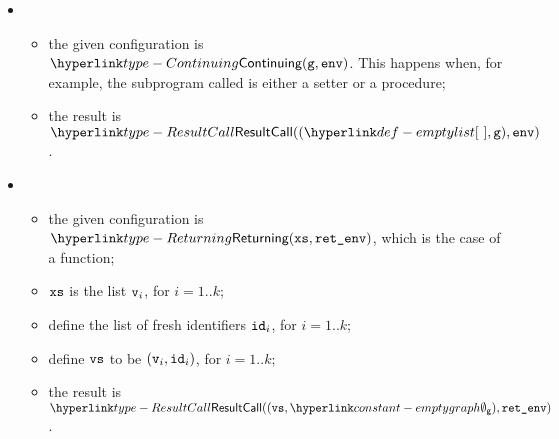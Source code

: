 \ProseParagraph
\OneApplies
\begin{itemize}
  \item {}
  \begin{itemize}
    \item the given configuration is $\Continuing(\vg, \env)$. This happens when,
    for example, the subprogram called is either a setter or a procedure;
    \item the result is $\ResultCall((\emptylist, \vg), \env)$.
  \end{itemize}

  \item {}
  \begin{itemize}
    \item the given configuration is $\Returning(\xs, \retenv)$, which is the case of a function;
    \item $\texttt{xs}$ is the list $\texttt{v}_i$, for $i=1..k$;
    \item define the list of fresh identifiers $\texttt{id}_i$, for $i=1..k$;
    \item define $\texttt{vs}$ to be $(\texttt{v}_i, \texttt{id}_i)$, for $i=1..k$;
    \item the result is $\ResultCall((\vvs, \emptygraph), \retenv)$.
  \end{itemize}
\end{itemize}

\FormallyParagraph
{}

